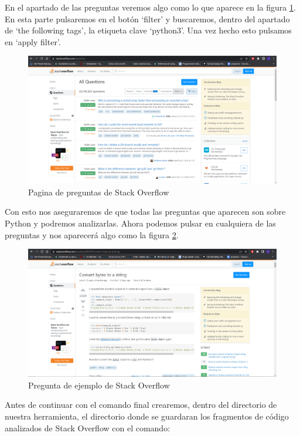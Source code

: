 \documentclass[a4paper, 12pt]{book}
\begin{document}
En el apartado de las preguntas veremos algo como lo que aparece en la figura \ref{figura:stack2}. En esta parte pulsaremos en el botón `filter' y buscaremos, dentro del apartado de `the following tags', la etiqueta clave `python3'. Una vez hecho esto pulsamos en `apply filter'.

\begin{figure}
    \includegraphics[bb=0 0 800 600, width=12cm, keepaspectratio]{img/stack2}
    \caption{Pagina de preguntas de Stack Overflow}
    \label{figura:stack2}
 \end{figure}
 
Con esto nos aseguraremos de que todas las preguntas que aparecen son sobre Python y podremos analizarlas. Ahora podemos pulsar en cualquiera de las preguntas y nos aparecerá algo como la figura \ref{figura:stack3}. 


\begin{figure}
    \includegraphics[bb=0 0 800 600, width=12cm, keepaspectratio]{img/stack3}
    \caption{Pregunta de ejemplo de Stack Overflow}
    \label{figura:stack3}
 \end{figure}
 
 
Antes de continuar con el comando final crearemos, dentro del directorio de nuestra herramienta, el directorio donde se guardaran los fragmentos de código analizados de Stack Overflow con el comando:
\end{document}
